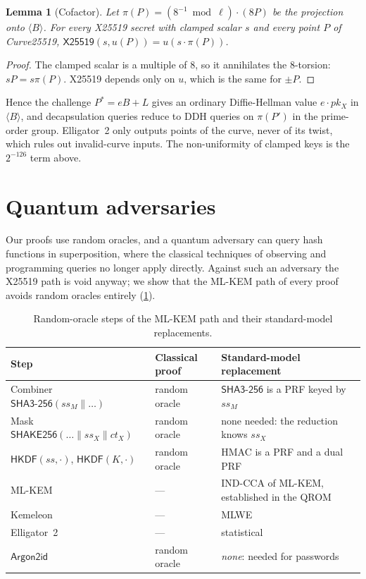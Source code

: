 \documentclass[11pt,a4paper]{article}
\newtheorem{lemma}[theorem]{Lemma}
\theoremstyle{definition}
\theoremstyle{remark}
\newcommand{\HKDF}{\mathsf{HKDF}}
\newcommand{\Argon}{\mathsf{Argon2id}}
\newcommand{\SHAKE}{\mathsf{SHAKE256}}
\newcommand{\SHA}{\mathsf{SHA3\text{-}256}}
\begin{document}
\begin{lemma}[Cofactor]
\label{lem:cofactor}
Let $\pi(P) = (8^{-1}\bmod\ell)\cdot(8P)$ be the projection onto $\langle B\rangle$. For every X25519 secret with clamped scalar $s$ and every point $P$ of Curve25519, $\mathsf{X25519}(s, u(P)) = u(s\cdot\pi(P))$.
\end{lemma}

\begin{proof}
The clamped scalar is a multiple of 8, so it annihilates the 8-torsion: $sP = s\pi(P)$. X25519 depends only on $u$, which is the same for $\pm P$.
\end{proof}

Hence the challenge $P^\ast = eB + L$ gives an ordinary Diffie-Hellman value $e\cdot pk_X$ in $\langle B\rangle$, and decapsulation queries reduce to DDH queries on $\pi(P')$ in the prime-order group. Elligator~2 only outputs points of the curve, never of its twist, which rules out invalid-curve inputs. The non-uniformity of clamped keys is the $2^{-126}$ term above.

\section{Quantum adversaries}
\label{sec:pq}

Our proofs use random oracles, and a quantum adversary can query hash functions in superposition, where the classical techniques of observing and programming queries no longer apply directly. Against such an adversary the X25519 path is void anyway; we show that the ML-KEM path of every proof avoids random oracles entirely (\cref{tab:pq}).

\begin{table}[t]
\centering
\small
\begin{tabular}{@{}p{4.4cm}p{2.2cm}p{7.4cm}@{}}
\toprule
Step & Classical proof & Standard-model replacement \\
\midrule
Combiner $\SHA(ss_M\|\dots)$ & random oracle & $\SHA$ is a PRF keyed by $ss_M$~\cite{xwing} \\
Mask $\SHAKE(\dots\|ss_X\|ct_X)$ & random oracle & none needed: the reduction knows $ss_X$ \\
$\HKDF(ss,\cdot)$, $\HKDF(K,\cdot)$ & random oracle & HMAC is a PRF and a dual PRF~\cite{dualprf} \\
ML-KEM & --- & IND-CCA of ML-KEM, established in the QROM~\cite{hhk17,bhhhp19} \\
Kemeleon & --- & MLWE \\
Elligator~2 & --- & statistical \\
$\Argon$ & random oracle & \emph{none}: needed for passwords \\
\bottomrule
\end{tabular}
\caption{Random-oracle steps of the ML-KEM path and their standard-model replacements.}
\label{tab:pq}
\end{table}
\end{document}
